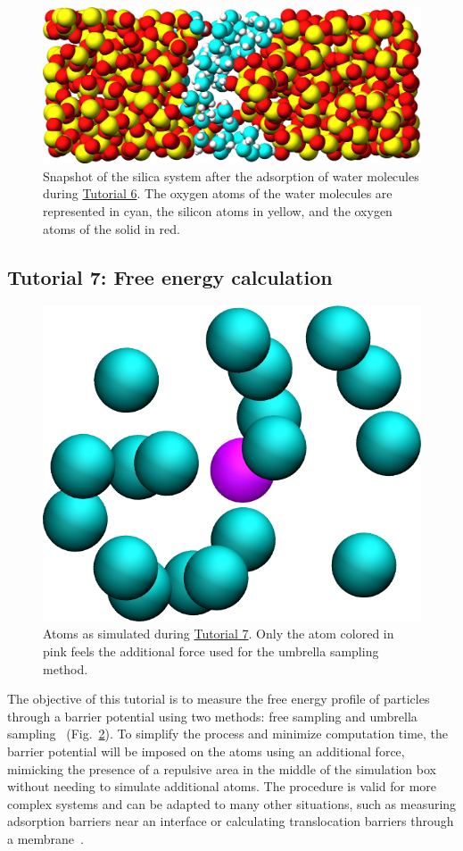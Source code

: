 \documentclass[9pt,tutorial]{livecoms}
\begin{document}
\begin{figure}
\centering
\includegraphics[width=\linewidth]{GCMC-solvated}
\caption{Snapshot of the silica system after the adsorption of water molecules
during \hyperref[gcmc-silica-label]{Tutorial 6}.
The oxygen atoms of the water molecules are represented in cyan, the silicon
atoms in yellow, and the oxygen atoms of the solid in red.}
\label{fig:GCMC-solvated}
\end{figure}

\subsection{Tutorial 7: Free energy calculation}
\label{umbrella-sampling-label}

\begin{figure}
\centering
\includegraphics[width=0.55\linewidth]{US}
\caption{Atoms as simulated during \hyperref[umbrella-sampling-label]{Tutorial 7}.
Only the atom colored in pink feels the additional force used for the umbrella
sampling method.}
\label{fig:US}
\end{figure}

\noindent The objective of this tutorial is to measure the free energy profile
of particles through a barrier potential using two methods: free sampling and
umbrella sampling~\cite{kastner2011umbrella, allen2017computer, frenkel2023understanding} (Fig.~\ref{fig:US}).
To simplify the process and minimize computation time, the barrier potential will be
imposed on the atoms using an additional force, mimicking the presence of a repulsive
area in the middle of the simulation box without needing to simulate additional atoms.
The procedure is valid for more complex systems and can be adapted to many other
situations, such as measuring adsorption barriers near an interface or calculating
translocation barriers through a membrane~\cite{wilson1997adsorption, makarov2009computer,
gravelle2021adsorption, loche2022molecular, hayatifar2024probing}.
\end{document}
